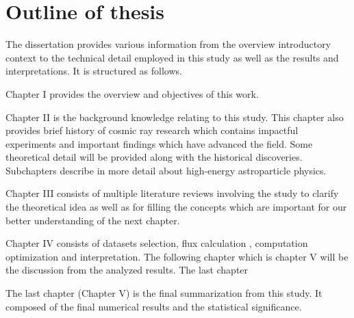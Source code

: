 \section{Outline of thesis}
The dissertation provides various information from the
overview introductory context to the technical detail employed
in this study as well as the results and interpretations. It is 
structured as follows.

Chapter I provides the overview and objectives of this work.

Chapter II is the background knowledge relating to this 
study. This chapter also provides brief history of cosmic ray 
research which contains impactful experiments and important
findings which have advanced the field.
Some theoretical detail will be provided along with the historical
discoveries. Subchapters describe in more detail about high-energy
astroparticle physics.

Chapter III consists of multiple literature reviews involving
the study to clarify the theoretical idea as well as for filling the
concepts which are important for our better understanding of the next chapter.



Chapter IV consists of datasets selection, flux calculation
, computation optimization and interpretation. The following chapter which is chapter V will be the discussion from the analyzed results.
The last chapter 

The last chapter (Chapter V) is the final summarization from this study.
It composed of the final numerical results and the statistical significance.
